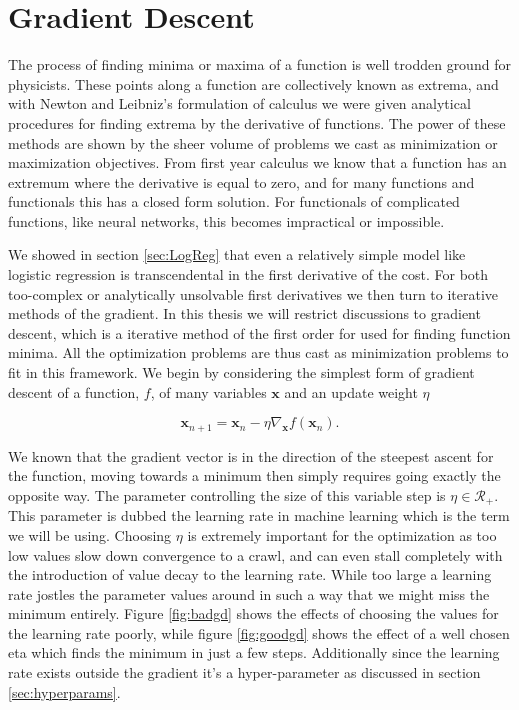 \section{Gradient Descent}\label{sec:gd}

The process of finding minima or maxima of a function is well trodden ground for physicists. These points along a function are collectively known as extrema, and with Newton and Leibniz's formulation of calculus we were given analytical procedures for finding extrema by the derivative of functions. The power of these methods are shown by the sheer volume of problems we cast as minimization or maximization objectives. From first year calculus we know that a function has an extremum where the derivative is equal to zero, and for many functions and functionals this has a closed form solution. For functionals of complicated functions, like neural networks, this becomes impractical or impossible. 

We showed in section \ref{sec:LogReg} that even a relatively simple model like logistic regression is transcendental in the first derivative of the cost. For both too-complex or analytically unsolvable first derivatives we then turn to iterative methods of the gradient. In this thesis we will restrict discussions to gradient descent, which is a iterative method of the first order for used for finding function minima. All the optimization problems are thus cast as minimization problems to fit in this framework. We begin by considering the simplest form of gradient descent of a function, $f$, of many variables $\mathbf{x}$ and an update weight $\eta$

\begin{equation}\label{eq:gd}
\mathbf{x}_{n+1} = \mathbf{x}_{n} - \eta \nabla_\mathbf{x} f(\mathbf{x}_{n}). 
\end{equation} 

\noindent We known that the gradient vector is in the direction of the steepest ascent for the function, moving towards a minimum then simply requires going exactly the opposite way. The parameter controlling the size of this variable step is  $\eta \in \mathcal{R}_+$. This parameter is dubbed the learning rate in machine learning which is the term we will be using. Choosing $\eta$ is extremely important for the optimization as too low values slow down convergence to a crawl, and can even stall completely with the introduction of value decay to the learning rate. While too large a learning rate jostles the parameter values around in such a way that we might miss the minimum entirely. Figure \ref{fig:badgd} shows the effects of choosing the values for the learning rate poorly, while figure \ref{fig:goodgd} shows the effect of a well chosen eta which finds the minimum in just a few steps. Additionally since the learning rate exists outside the gradient it's a hyper-parameter as discussed in section \ref{sec:hyperparams}. 



